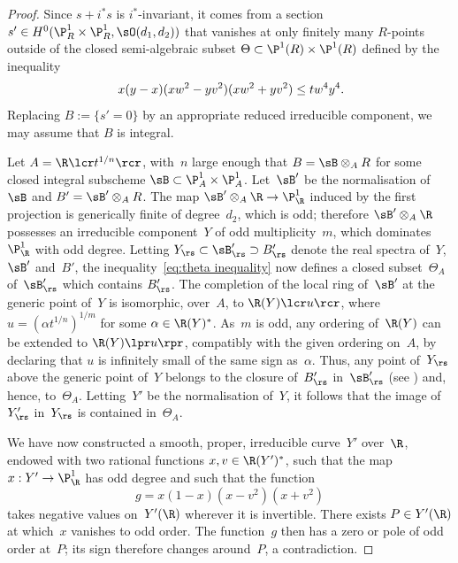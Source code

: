 \begin{proof}
Since $s+i^*s$ is $i^*$-invariant, it comes from a
section $s'\in H^0(\P^1_R\times\P^1_R,\sO(d_1,d_2))$ that vanishes at only finitely many
$R$\nobreakdash-points outside of the closed semi-algebraic subset
$\Theta \subset \P^1(R)\times \P^1(R)$
defined by the inequality
\begin{equation}
\label{eq:theta inequality}
x(y-x)(xw^2-yv^2)(xw^2+yv^2)\leq tw^4y^4\rlap{.}
\end{equation}
Replacing $B:=\{s'=0\}$ by an appropriate reduced irreducible component, we
may assume that $B$ is integral.

Let $A=\R\lcr t^{1/n}\rcr$, with~$n$ large enough that
$B=\sB\otimes_A R$ for some closed integral
subscheme $\sB \subset \P^1_A \times \P^1_A$.
Let~$\sB'$ be the normalisation of~$\sB$ and $B'=\sB'\otimes_AR$.
The map $\sB'\otimes_A \R \to \P^1_\R$ induced by the first projection
is generically finite of degree~$d_2$, which is odd;
therefore $\sB' \otimes_A \R$ possesses an irreducible component~$Y$ of odd multiplicity~$m$,
which dominates~$\P^1_\R$ with odd degree.
Letting $Y_\rs \subset \sB'_\rs \supset B'_\rs$ denote the real spectra of~$Y$, $\sB'$
and~$B'$,
the inequality~\eqref{eq:theta inequality} now defines a closed subset~$\Theta_A$ of~$\sB'_\rs$
which contains $B'_\rs$.
The completion of the local ring of~$\sB'$ at the generic point of~$Y$ is isomorphic,
over~$A$, to $\R(Y)\lcr u\rcr$, where $u=(\alpha t^{1/n})^{1/m}$ for some $\alpha \in \R(Y)^*$.
As~$m$ is odd,
any ordering of~$\R(Y)$ can be extended to $\R(Y)\lpr u\rpr$, compatibly with the given ordering on~$A$,
by declaring that $u$ is infinitely small of the same sign as~$\alpha$.
Thus, any point of~$Y_\rs$ above the generic point of~$Y$ belongs to the closure of~$B'_\rs$ in~$\sB'_\rs$
(see \cite[Prop.\,7.1.21]{bcr}) and, hence, to~$\Theta_A$.
Letting~$Y'$ be the normalisation of~$Y$, it follows that the image of~$Y'_\rs$ in~$Y_\rs$
is contained in~$\Theta_A$.

We have now constructed a smooth, proper, irreducible curve~$Y'$ over~$\R$, endowed with two rational
functions $x,v \in \R(Y')^*$, such that the map $x:Y'\to \P^1_\R$ has odd degree and such that
the function
\[
g=x(1-x)(x-v^2)(x+v^2)
\]
takes negative values on~$Y'(\R)$
wherever it is invertible.
There exists $P \in Y'(\R)$ at which~$x$ vanishes to odd order.
The function~$g$ then has a zero or pole of odd order at~$P$; its
sign therefore changes around~$P$, a contradiction.
\end{proof}
